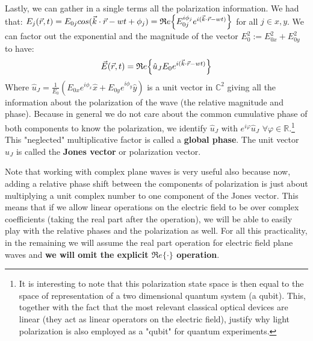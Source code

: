 \documentclass[11pt, a4paper, twoside]{article} %
\newcommand{\R}{\mathbb{R}} %
\newcommand{\C}{\mathbb{C}}
\begin{document}
 Lastly, we can gather in a single terms all the polarization information. We had that: $E_j(\vec{r},t)=E_{0j}cos(\vec{k}\cdot\vec{r}-wt+\phi_j)=\mathfrak{R}e\qty{E_{0j}^{i\phi_j}e^{i(\vec{k}\cdot\vec{r}-wt)}}$ for all $j\in{x,y}$. We can factor out the exponential and the magnitude of the vector $E_0^2:=E_{0x}^2+E_{0y}^2$ to have:\vspace{-0.1cm}
\begin{equation}
\vec{E}(\vec{r},t)=\mathfrak{R}e\qty{\hat{u}_JE_0e^{i(\vec{k}\cdot\vec{r}-wt)} }\vspace{-0.1cm}
\end{equation}
Where $\hat{u}_J=\frac{1}{E_0}(E_{0x}e^{i\phi_x}\hat{x}+E_{0y}e^{i\phi_y}\hat{y})$ is a unit vector in $\C^2$ giving all the information about the polarization of the wave (the relative magnitude and phase). Because in general we do not care about the common cumulative phase of both components to know the polarization, we identify $\hat{u}_J$ with $e^{i\varphi}\hat{u}_J$ $\forall 	\varphi\in\R$.\footnote{It is interesting to note that this polarization state space is then equal to the space of representation of a two dimensional quantum system (a qubit). This, together with the fact that the most relevant classical optical devices are linear (they act as linear operators on the electric field), justify why light polarization is also employed as a "qubit" for quantum experiments.} This "neglected" multiplicative factor is called a {\bf global phase}. The unit vector $\hat{u}_J$ is called the {\bf Jones vector} or polarization vector.\vspace{-0.1cm}

Note that working with complex plane waves is very useful also because now, adding a relative phase shift between the components of polarization is just about multiplying a unit complex number to one component of the Jones vector. This means that if we allow linear operations on the electric field to be over complex coefficients (taking the real part after the operation), we will be able to easily play with the relative phases and the polarization as well. For all this practicality, in the remaining we will assume the real part operation for electric field plane waves and {\bf we will omit the explicit $\mathfrak{R}e\{\cdot\}$ operation}.

\end{document}
